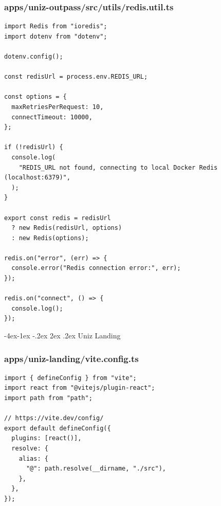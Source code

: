 \documentclass[11pt,a4paper,oneside]{article}
\makeatletter
\renewcommand{\subsection}{\@startsection{subsection}{2}{\z@}%
    {-4ex\@plus -1ex \@minus -.2ex}%
    {2ex \@plus .2ex}%
    {\normalfont\Large\bfseries\color{accent}}}
\makeatother
\begin{document}
\subsubsection*{apps/uniz-outpass/src/utils/redis.util.ts}
\begin{lstlisting}
import Redis from "ioredis";
import dotenv from "dotenv";

dotenv.config();

const redisUrl = process.env.REDIS_URL;

const options = {
  maxRetriesPerRequest: 10,
  connectTimeout: 10000,
};

if (!redisUrl) {
  console.log(
    "REDIS_URL not found, connecting to local Docker Redis (localhost:6379)",
  );
}

export const redis = redisUrl
  ? new Redis(redisUrl, options)
  : new Redis(options);

redis.on("error", (err) => {
  console.error("Redis connection error:", err);
});

redis.on("connect", () => {
  console.log();
});

\end{lstlisting}

\subsection{Uniz Landing}
\subsubsection*{apps/uniz-landing/vite.config.ts}
\begin{lstlisting}
import { defineConfig } from "vite";
import react from "@vitejs/plugin-react";
import path from "path";

// https://vite.dev/config/
export default defineConfig({
  plugins: [react()],
  resolve: {
    alias: {
      "@": path.resolve(__dirname, "./src"),
    },
  },
});

\end{lstlisting}
\end{document}
